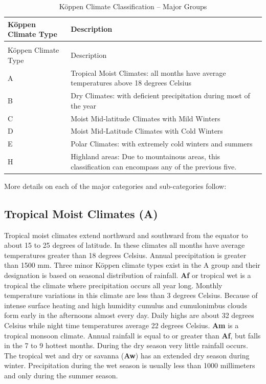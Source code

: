 \begin{longtable}[c]{p{1.5in}p{4.5in}}
\caption{Köppen Climate Classification -- Major Groups \label{table:kppen-climate-classification-major-groups}} \tabularnewline
\toprule 
Köppen Climate Type & Description \tabularnewline \midrule
\endfirsthead

\caption[]{Köppen Climate Classification -- Major Groups} \tabularnewline
\toprule 
Köppen Climate Type & Description \tabularnewline \midrule
\endhead

A & Tropical Moist Climates: all months have average temperatures above 18 degrees Celsius \tabularnewline
B & Dry Climates: with deficient precipitation during most of the year \tabularnewline
C & Moist Mid-latitude Climates with Mild Winters \tabularnewline
D & Moist Mid-Latitude Climates with Cold Winters \tabularnewline
E & Polar Climates: with extremely cold winters and summers \tabularnewline
H & Highland areas: Due to mountainous areas, this classification can encompass any of the previous five. \tabularnewline
\bottomrule
\end{longtable}

More details on each of the major categories and sub-categories follow:

\subsection{Tropical Moist Climates (A)}\label{tropical-moist-climates-a}

Tropical moist climates extend northward and southward from the equator to about 15 to 25 degrees of latitude. In these climates all months have average temperatures greater than 18 degrees Celsius. Annual precipitation is greater than 1500 mm. Three minor Köppen climate types exist in the A group and their designation is based on seasonal distribution of rainfall. \textbf{Af} or tropical wet is a tropical the climate where precipitation occurs all year long. Monthly temperature variations in this climate are less than 3 degrees Celsius. Because of intense surface heating and high humidity cumulus and cumulonimbus clouds form early in the afternoons almost every day. Daily highs are about 32 degrees Celsius while night time temperatures average 22 degrees Celsius. \textbf{Am} is a tropical monsoon climate. Annual rainfall is equal to or greater than \textbf{Af}, but falls in the 7 to 9 hottest months. During the dry season very little rainfall occurs. The tropical wet and dry or savanna (\textbf{Aw}) has an extended dry season during winter. Precipitation during the wet season is usually less than 1000 millimeters and only during the summer season.

